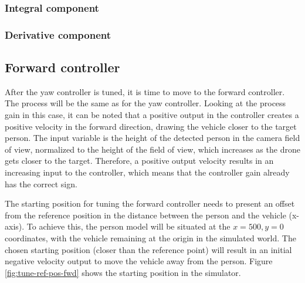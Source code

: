 \subsubsection{Integral component}
\subsubsection{Derivative component}







\subsection{Forward controller}

After the yaw controller is tuned, it is time to move to the forward controller.
The process will be the same as for the yaw controller. Looking at the process gain in this case, it can be noted that a positive output in the controller creates a positive velocity in the forward direction, drawing the vehicle closer to the target person. The input variable is the height of the detected person in the camera field of view, normalized to the height of the field of view, which increases as the drone gets closer to the target. Therefore, a positive output velocity results in an increasing input to the controller, which means that the controller gain already has the correct sign.

The starting position for tuning the forward controller needs to present an offset from the reference position in the distance between the person and the vehicle (x-axis). To achieve this, the person model will be situated at the $x=500, y=0$ coordinates, with the vehicle remaining at the origin in the simulated world. The chosen starting position (closer than the reference point) will result in an initial negative velocity output to move the vehicle away from the person. Figure \ref{fig:tune-ref-pos-fwd} shows the starting position in the simulator.


